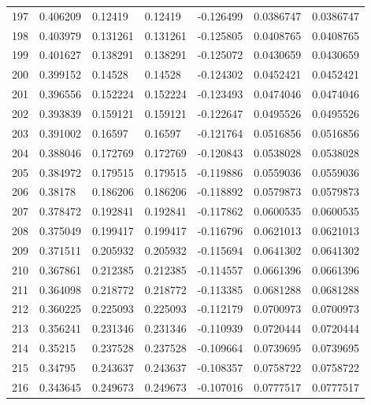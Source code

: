 \begin{longtable}{l|lll|lll}
 197 &  0.406209    & 0.12419     & 0.12419     & -0.126499    & 0.0386747   & 0.0386747   \\
 198 &  0.403979    & 0.131261    & 0.131261    & -0.125805    & 0.0408765   & 0.0408765   \\
 199 &  0.401627    & 0.138291    & 0.138291    & -0.125072    & 0.0430659   & 0.0430659   \\
 200 &  0.399152    & 0.14528     & 0.14528     & -0.124302    & 0.0452421   & 0.0452421   \\
 201 &  0.396556    & 0.152224    & 0.152224    & -0.123493    & 0.0474046   & 0.0474046   \\
 202 &  0.393839    & 0.159121    & 0.159121    & -0.122647    & 0.0495526   & 0.0495526   \\
 203 &  0.391002    & 0.16597     & 0.16597     & -0.121764    & 0.0516856   & 0.0516856   \\
 204 &  0.388046    & 0.172769    & 0.172769    & -0.120843    & 0.0538028   & 0.0538028   \\
 205 &  0.384972    & 0.179515    & 0.179515    & -0.119886    & 0.0559036   & 0.0559036   \\
 206 &  0.38178     & 0.186206    & 0.186206    & -0.118892    & 0.0579873   & 0.0579873   \\
 207 &  0.378472    & 0.192841    & 0.192841    & -0.117862    & 0.0600535   & 0.0600535   \\
 208 &  0.375049    & 0.199417    & 0.199417    & -0.116796    & 0.0621013   & 0.0621013   \\
 209 &  0.371511    & 0.205932    & 0.205932    & -0.115694    & 0.0641302   & 0.0641302   \\
 210 &  0.367861    & 0.212385    & 0.212385    & -0.114557    & 0.0661396   & 0.0661396   \\
 211 &  0.364098    & 0.218772    & 0.218772    & -0.113385    & 0.0681288   & 0.0681288   \\
 212 &  0.360225    & 0.225093    & 0.225093    & -0.112179    & 0.0700973   & 0.0700973   \\
 213 &  0.356241    & 0.231346    & 0.231346    & -0.110939    & 0.0720444   & 0.0720444   \\
 214 &  0.35215     & 0.237528    & 0.237528    & -0.109664    & 0.0739695   & 0.0739695   \\
 215 &  0.34795     & 0.243637    & 0.243637    & -0.108357    & 0.0758722   & 0.0758722   \\
 216 &  0.343645    & 0.249673    & 0.249673    & -0.107016    & 0.0777517   & 0.0777517   \\

\end{longtable}
